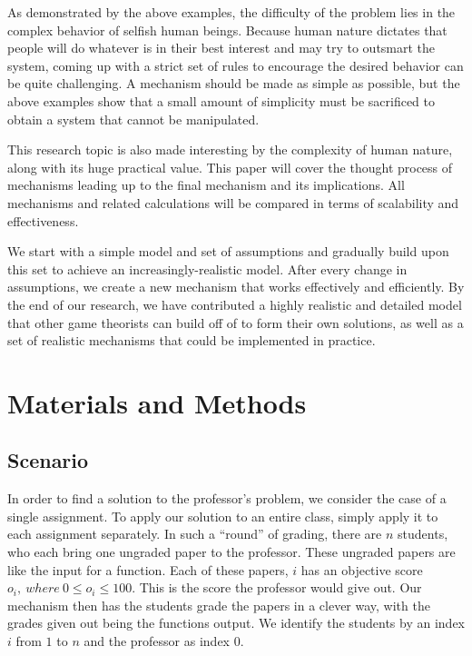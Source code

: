 \documentclass[12pt, Arial]{article}
\begin{document}
As demonstrated by the above examples, the difficulty of the problem lies in the complex behavior of selfish human beings. Because human nature dictates that people will do whatever is in their best interest and may try to outsmart the system, coming up with a strict set of rules to encourage the desired behavior can be quite challenging. A mechanism should be made as simple as possible, but the above examples show that a small amount of simplicity must be sacrificed to obtain a system that cannot be manipulated.

This research topic is also made interesting by the complexity of human nature, along with its huge practical value. This paper will cover the thought process of mechanisms leading up to the final mechanism and its implications. All mechanisms and related calculations will be compared in terms of scalability and effectiveness.

We start with a simple model and set of assumptions and gradually build upon this set to achieve an increasingly-realistic model. After every change in assumptions, we create a new mechanism that works effectively and efficiently. By the end of our research, we have contributed a highly realistic and detailed model that other game theorists can build off of to form their own solutions, as well as a set of realistic mechanisms that could be implemented in practice.
\section{Materials and Methods}
\subsection{Scenario}
In order to find a solution to the professor's problem, we consider the case of a single assignment. To apply our solution to an entire class, simply apply it to each assignment separately. In such a ``round'' of grading, there are $n$ students, who each bring one ungraded paper to the professor. These ungraded papers are like the input for a function. Each of these papers, $i$ has an objective score $o_i,~where~ 0\leq o_i \leq 100$. This is the score the professor would give out. Our mechanism then has the students grade the papers in a clever way, with the grades given out being the functions output. We identify the students by an index $i$ from $1$ to $n$ and the professor as index $0$.
\end{document}
